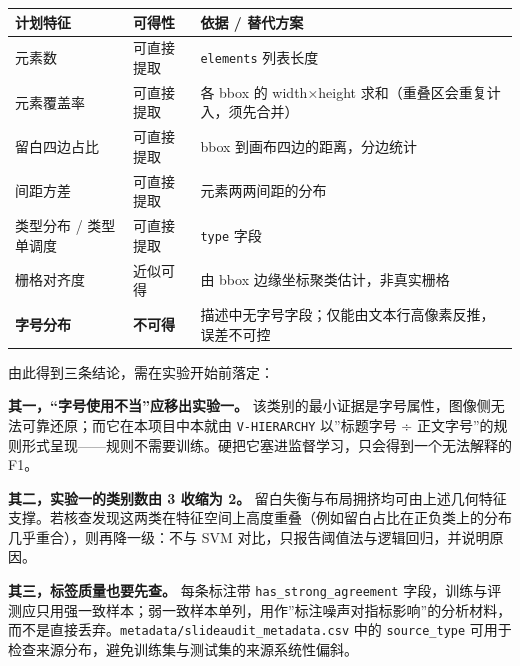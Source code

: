\documentclass[
  11pt,
]{article}
\newcounter{none} %
\begin{document}
{\def\LTcaptype{none} %
\begin{longtable}[]{@{}
  >{\raggedright\arraybackslash}p{}
  >{\raggedright\arraybackslash}p{}
  >{\raggedright\arraybackslash}p{}@{}}
\toprule\noalign{}
\begin{minipage}[b]{\linewidth}\raggedright
计划特征
\end{minipage} & \begin{minipage}[b]{\linewidth}\raggedright
可得性
\end{minipage} & \begin{minipage}[b]{\linewidth}\raggedright
依据 / 替代方案
\end{minipage} \\
\midrule\noalign{}
\endhead
\bottomrule\noalign{}
\endlastfoot
元素数 & 可直接提取 & \texttt{elements} 列表长度 \\
元素覆盖率 & 可直接提取 & 各 bbox 的 width×height
求和（重叠区会重复计入，须先合并） \\
留白四边占比 & 可直接提取 & bbox 到画布四边的距离，分边统计 \\
间距方差 & 可直接提取 & 元素两两间距的分布 \\
类型分布 / 类型单调度 & 可直接提取 & \texttt{type} 字段 \\
栅格对齐度 & 近似可得 & 由 bbox 边缘坐标聚类估计，非真实栅格 \\
\textbf{字号分布} & \textbf{不可得} &
描述中无字号字段；仅能由文本行高像素反推，误差不可控 \\
\end{longtable}
}

由此得到三条结论，需在实验开始前落定：

\textbf{其一，``字号使用不当''应移出实验一。}
该类别的最小证据是字号属性，图像侧无法可靠还原；而它在本项目中本就由
\texttt{V-HIERARCHY} 以''标题字号 ÷
正文字号''的规则形式呈现------规则不需要训练。硬把它塞进监督学习，只会得到一个无法解释的
F1。

\textbf{其二，实验一的类别数由 3 收缩为 2。}
留白失衡与布局拥挤均可由上述几何特征支撑。若核查发现这两类在特征空间上高度重叠（例如留白占比在正负类上的分布几乎重合），则再降一级：不与
SVM 对比，只报告阈值法与逻辑回归，并说明原因。

\textbf{其三，标签质量也要先查。} 每条标注带
\texttt{has\_strong\_agreement}
字段，训练与评测应只用强一致样本；弱一致样本单列，用作''标注噪声对指标影响''的分析材料，而不是直接丢弃。\texttt{metadata/slideaudit\_metadata.csv}
中的 \texttt{source\_type}
可用于检查来源分布，避免训练集与测试集的来源系统性偏斜。
\end{document}
